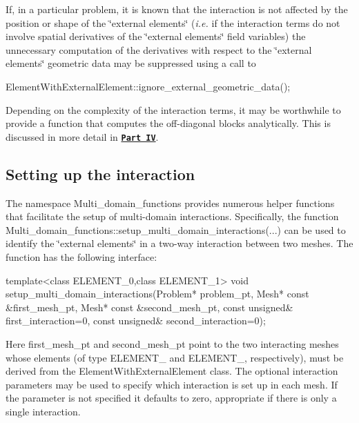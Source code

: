If, in a particular problem, it is known that the interaction is not affected by the position or shape of the \char`\"{}external elements\char`\"{} ({\itshape  i.\+e. } if the interaction terms do not involve spatial derivatives of the \char`\"{}external element\textquotesingle{}s\char`\"{} field variables) the unnecessary computation of the derivatives with respect to the \char`\"{}external element\textquotesingle{}s\char`\"{} geometric data may be suppressed using a call to


\begin{DoxyCode}
ElementWithExternalElement::ignore\_external\_geometric\_data();
\end{DoxyCode}


Depending on the complexity of the interaction terms, it may be worthwhile to provide a function that computes the off-\/diagonal blocks analytically. This is discussed in more detail in \href{#optimise}{\tt {\bfseries Part IV}}.



\hypertarget{index_setting_up_interaction}{}\subsection{Setting up the interaction}\label{index_setting_up_interaction}
The namespace {\ttfamily Multi\+\_\+domain\+\_\+functions} provides numerous helper functions that facilitate the setup of multi-\/domain interactions. Specifically, the function {\ttfamily Multi\+\_\+domain\+\_\+functions\+::setup\+\_\+multi\+\_\+domain\+\_\+interactions}(...) can be used to identify the \char`\"{}external elements\char`\"{} in a two-\/way interaction between two meshes. The function has the following interface\+:


\begin{DoxyCode}
\textcolor{keyword}{template}<\textcolor{keyword}{class} ELEMENT\_0,\textcolor{keyword}{class} ELEMENT\_1>     
\textcolor{keywordtype}{void} setup\_multi\_domain\_interactions(Problem* problem\_pt, 
                                     Mesh* \textcolor{keyword}{const} &first\_mesh\_pt,
                                     Mesh* \textcolor{keyword}{const} &second\_mesh\_pt,
                                     \textcolor{keyword}{const} \textcolor{keywordtype}{unsigned}& first\_interaction=0,
                                     \textcolor{keyword}{const} \textcolor{keywordtype}{unsigned}& second\_interaction=0);
\end{DoxyCode}


Here {\ttfamily first\+\_\+mesh\+\_\+pt} and {\ttfamily second\+\_\+mesh\+\_\+pt} point to the two interacting meshes whose elements (of type {\ttfamily E\+L\+E\+M\+E\+N\+T\+\_} and {\ttfamily E\+L\+E\+M\+E\+N\+T\+\_}, respectively), must be derived from the {\ttfamily Element\+With\+External\+Element} class. The optional interaction parameters may be used to specify which interaction is set up in each mesh. If the parameter is not specified it defaults to zero, appropriate if there is only a single interaction.

